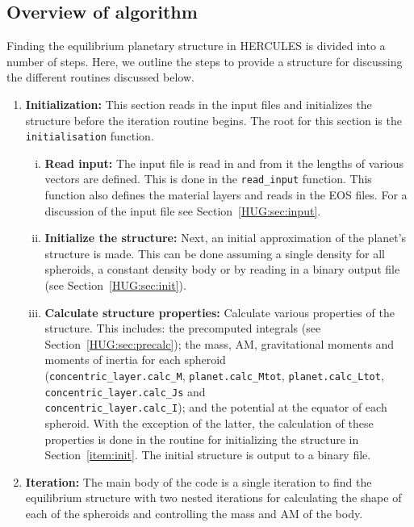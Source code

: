 \documentclass[11pt, oneside]{article}   	%
\begin{document}
\subsection{Overview of algorithm}

Finding the equilibrium planetary structure in HERCULES is divided into a number of steps. 
Here, we outline the steps to provide a structure for discussing the different routines discussed below. 

\begin{enumerate}
\item {\bf Initialization:} This section reads in the input files and initializes the structure before the iteration routine begins. 
The root for this section is the \texttt{initialisation} function.
\begin{enumerate}[i.]
%
\item {\bf Read input:} The input file is read in and from it the lengths of various vectors are defined. 
This is done in the \texttt{read\_input} function. 
This function also defines the material layers and reads in the EOS files.
For a discussion of the input file see Section~\ref{HUG:sec:input}. 
%
\item \label{item:init} {\bf Initialize the structure:} Next, an initial approximation of the planet's structure is made.
This can be done assuming a single density for all spheroids, a constant density body or by reading in a binary output file (see Section~\ref{HUG:sec:init}).
%
\item {\bf Calculate structure properties:} Calculate various properties of the structure. 
This includes: the precomputed integrals (see Section~\ref{HUG:sec:precalc}); the mass, AM, gravitational moments and moments of inertia for each spheroid \\\noindent(\texttt{concentric\_layer.calc\_M}, \texttt{planet.calc\_Mtot},  \texttt{planet.calc\_Ltot}, \\\noindent \texttt{concentric\_layer.calc\_Js} and \\ \noindent \texttt{concentric\_layer.calc\_I}); and the potential at the equator of each spheroid.
With the exception of the latter, the calculation of these properties is done in the routine for initializing the structure in Section~\ref{item:init}. The initial structure is output to a binary file.
\end{enumerate}
\item {\bf Iteration:} The main body of the code is a single iteration to find the equilibrium structure with two nested iterations for calculating the shape of each of the spheroids and controlling the mass and AM of the body. 

\end{enumerate}
\end{document}
